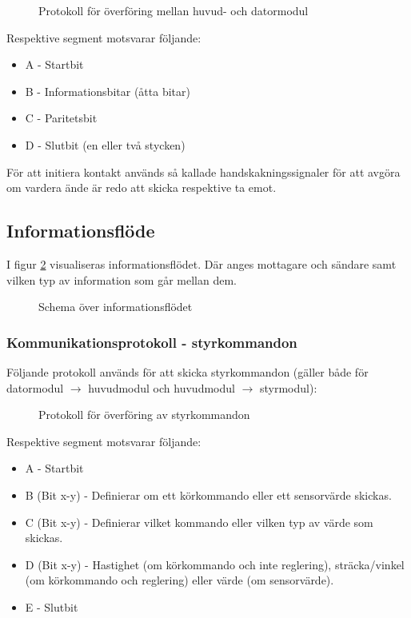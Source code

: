 \documentclass[11pt]{article}
\begin{document}
\begin{flushleft}
\begin{figure}[htbp]
\centering
\noindent\resizebox{.8\linewidth}{!}{
	}
	\caption{Protokoll för överföring mellan huvud- och datormodul \label{bluetooth}}	
\end{figure}

Respektive segment motsvarar följande:
\begin{itemize}
	\item A - Startbit
	\item B - Informationsbitar (åtta bitar)
	\item C - Paritetsbit
	\item D - Slutbit (en eller två stycken)
\end{itemize}

För att initiera kontakt används så kallade handskakningssignaler för att avgöra om vardera ände är redo att skicka respektive ta emot.

\subsection{Informationsflöde}
I figur \ref{informationFlow} visualiseras informationsflödet. Där anges mottagare och sändare samt vilken typ av information som går mellan dem.

\begin{figure}[htbp]
\centering
\noindent\resizebox{.8\linewidth}{!}{
	}
	\caption{Schema över informationsflödet\label{informationFlow}}	
\end{figure}

\subsubsection{Kommunikationsprotokoll - styrkommandon}
Följande protokoll används för att skicka styrkommandon (gäller både för datormodul $\rightarrow$ huvudmodul och huvudmodul $\rightarrow$ styrmodul):

\begin{figure}[htbp]
\centering
\noindent\resizebox{.8\linewidth}{!}{
	}
	\caption{Protokoll för överföring av styrkommandon\label{styrdata}}	
\end{figure}

Respektive segment motsvarar följande: 
\begin{itemize}
	\item A - Startbit
	\item B (Bit x-y) - Definierar om ett körkommando eller ett sensorvärde skickas.
	\item C (Bit x-y) - Definierar vilket kommando eller vilken typ av värde som skickas.
	\item D (Bit x-y) - Hastighet (om körkommando och inte reglering), sträcka/vinkel (om körkommando och reglering) eller värde (om sensorvärde).
	\item E - Slutbit
\end{itemize}


\end{flushleft}
\end{document}
